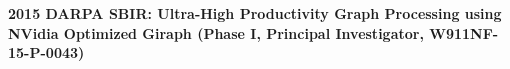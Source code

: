 \begin{itemize}
 	
 	
 	\textbf{2015 DARPA SBIR: Ultra-High Productivity Graph Processing using
 	NVidia Optimized Giraph (Phase I, Principal Investigator,
 	W911NF-15-P-0043)}
 	
% 	
 	

\end{itemize}
